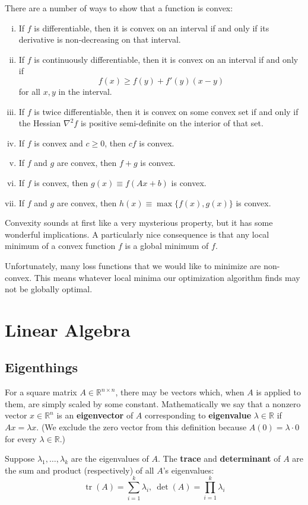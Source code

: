 \documentclass{article}
\DeclareMathOperator*{\tr}{tr}
\newcommand{\R}{\mathbb{R}}
\newcommand{\term}[1]{\textbf{#1}}
\begin{document}
There are a number of ways to show that a function is convex:
\begin{enumerate}[(i)]
\item If $f$ is differentiable, then it is convex on an interval if and only if its derivative is non-decreasing on that interval.
\item If $f$ is continuously differentiable, then it is convex on an interval if and only if
\[f(x) \geq f(y) + f'(y)(x-y)\]
for all $x,y$ in the interval.
\item If $f$ is twice differentiable, then it is convex on some convex set if and only if the Hessian $\nabla^2 f$ is positive semi-definite on the interior of that set.
\item If $f$ is convex and $c \geq 0$, then $cf$ is convex.
\item If $f$ and $g$ are convex, then $f+g$ is convex.
\item If $f$ is convex, then $g(x) \equiv f(Ax + b)$ is convex.
\item If $f$ and $g$ are convex, then $h(x) \equiv \max\{f(x),g(x)\}$ is convex.
\end{enumerate}

Convexity sounds at first like a very mysterious property, but it has some wonderful implications. A particularly nice consequence is that any local minimum of a convex function $f$ is a global minimum of $f$.

Unfortunately, many loss functions that we would like to minimize are non-convex. This means whatever local minima our optimization algorithm finds may not be globally optimal.

\newpage
\section{Linear Algebra}
\subsection{Eigenthings}
For a square matrix $A \in \R^{n \times n}$, there may be vectors which, when $A$ is applied to them, are simply scaled by some constant. Mathematically we say that a nonzero vector $x \in \R^n$ is an \term{eigenvector} of $A$ corresponding to \term{eigenvalue} $\lambda \in \R$ if $Ax = \lambda x$. (We exclude the zero vector from this definition because $A(0) = \lambda \cdot 0$ for every $\lambda \in \R$.)

Suppose $\lambda_1, \dots, \lambda_k$ are the eigenvalues of $A$. The \term{trace} and \term{determinant} of $A$ are the sum and product (respectively) of all $A$'s eigenvalues:
\[\tr(A) = \sum_{i=1}^k \lambda_i, ~ \det(A) = \prod_{i=1}^k \lambda_i\]
\end{document}
